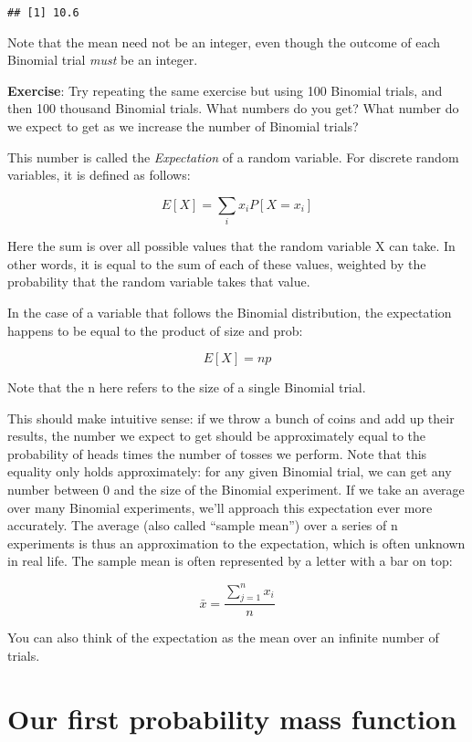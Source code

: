 \documentclass[
]{book}
\begin{document}
\begin{verbatim}
## [1] 10.6
\end{verbatim}

Note that the mean need not be an integer, even though the outcome of each Binomial trial \emph{must} be an integer.

\textbf{Exercise}: Try repeating the same exercise but using 100 Binomial trials, and then 100 thousand Binomial trials. What numbers do you get? What number do we expect to get as we increase the number of Binomial trials?

This number is called the \emph{Expectation} of a random variable. For discrete random variables, it is defined as follows:

\[E[X] = \sum_{i}x_iP[X=x_i]\]

Here the sum is over all possible values that the random variable X can take. In other words, it is equal to the sum of each of these values, weighted by the probability that the random variable takes that value.

In the case of a variable that follows the Binomial distribution, the expectation happens to be equal to the product of size and prob:

\[E[X] = np\]

Note that the n here refers to the size of a single Binomial trial.

This should make intuitive sense: if we throw a bunch of coins and add up their results, the number we expect to get should be approximately equal to the probability of heads times the number of tosses we perform. Note that this equality only holds approximately: for any given Binomial trial, we can get any number between 0 and the size of the Binomial experiment. If we take an average over many Binomial experiments, we'll approach this expectation ever more accurately. The average (also called ``sample mean'') over a series of n experiments is thus an approximation to the expectation, which is often unknown in real life. The sample mean is often represented by a letter with a bar on top:

\[\bar{x} = \frac{\sum_{j=1}^{n}x_{i}}{n}\]

You can also think of the expectation as the mean over an infinite number of trials.

\hypertarget{our-first-probability-mass-function}{%
\section{Our first probability mass function}\label{our-first-probability-mass-function}}
\end{document}
